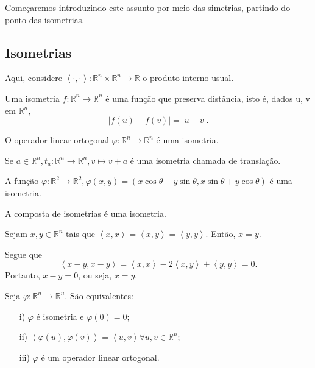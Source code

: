 \documentclass[Algebra/algebra_notes.tex]{subfiles}
\begin{document}
Começaremos introduzindo este assunto por meio das simetrias, partindo do ponto das isometrias.
\subsection{Isometrias}
Aqui, considere $\left< \cdot , \cdot  \right>:\mathbb{R}^{n}\times \mathbb{R}^{n}\rightarrow \mathbb{R}$ o produto interno usual.
\begin{def*}
	Uma isometria $f:\mathbb{R}^{n}\rightarrow \mathbb{R}^{n}$ é uma função que preserva distância, isto é,
	dados u, v em $\mathbb{R}^{n},$
	$$
		|f(u)-f(v)| = |u-v|.
	$$
\end{def*}
\begin{example*}
	O operador linear ortogonal $\varphi :\mathbb{R}^{n}\rightarrow \mathbb{R}^{n}$ é uma isometria.
\end{example*}
\begin{example*}
	Se $a\in \mathbb{R}^{n}, t_{a}:\mathbb{R}^{n}\rightarrow \mathbb{R}^{n}, v\mapsto v+a$ é uma isometria chamada
	de translação.
\end{example*}
\begin{example*}
	A função $\varphi :\mathbb{R}^{2}\rightarrow \mathbb{R}^{2}, \varphi (x,y)=(x\cos{\theta }-y\sin{\theta }, x\sin{\theta }+y\cos{\theta })$
	é uma isometria.
\end{example*}
\begin{example*}
	A composta de isometrias é uma isometria.
\end{example*}
\begin{lemma*}
	Sejam $x,y\in \mathbb{R}^{n}$ tais que $\left< x, x \right> = \left< x, y \right> = \left< y, y \right>.$ Então,
	$x = y.$
\end{lemma*}
\begin{proof*}
	Segue que
	$$
		\left< x-y, x-y \right> = \left< x, x \right>-2\left< x, y \right>+\left< y, y \right> = 0.
	$$
	Portanto, $x-y =0$, ou seja, $x=y.$ \qedsymbol
\end{proof*}
\begin{theorem*}
	Seja $\varphi :\mathbb{R}^{n}\rightarrow \mathbb{R}^{n}.$ São equivalentes:
	\begin{itemize}
		\item[i)] $\varphi $ é isometria e $\varphi (0)=0;$
		\item[ii)] $\left< \varphi (u), \varphi (v) \right> = \left< u, v \right>\forall u, v\in \mathbb{R}^{n};$
		\item[iii)]$\varphi $ é um operador linear ortogonal.
	\end{itemize}
\end{theorem*}
\end{document}
